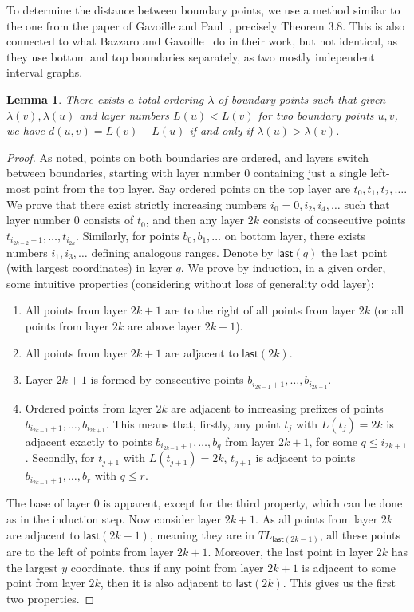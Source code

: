 \documentclass[a4paper,11pt]{article}
\newcommand{\lam}{\lambda}
\newcommand{\last}{\mathsf{last}}
\newtheorem{lemma}[theorem]{Lemma}
\begin{document}
To determine the distance between boundary points, we use a method similar to the one from the paper of
Gavoille and Paul~\cite{GavInterval}, precisely Theorem 3.8.
This is also connected to what Bazzaro and Gavoille~\cite{BazzaroG05} do in their work, but not identical,
as they use bottom and top boundaries separately, as two mostly independent interval graphs.

\begin{lemma}
There exists a total ordering $\lam$ of boundary points such that given $\lam(v), \lam(u)$
and layer numbers $L(u) < L(v)$ for two boundary points $u,v$, we have $d(u,v)=L(v)-L(u)$
if and only if $\lam(u) > \lam(v)$.
\label{Lem:Lambda}
\end{lemma}
\begin{proof}
As noted, points on both boundaries are ordered, and layers switch between boundaries,
starting with layer number 0 containing just a single left-most point from the top layer.
Say ordered points on the top layer are $t_0,t_1,t_2,\ldots$.
We prove that there exist strictly increasing numbers $i_0=0,i_2,i_4,\ldots$ such that layer number 0 consists of $t_0$,
and then any layer $2k$ consists of consecutive points $t_{i_{2k-2}+1},\ldots,t_{i_{2k}}$.
Similarly, for points $b_0,b_1,\ldots$ on bottom layer, there exists numbers $i_1,i_3,\ldots$ defining analogous ranges.
Denote by $\last(q)$ the last point (with largest coordinates) in layer $q$.
We prove by induction, in a given order, some intuitive properties (considering without loss of generality odd layer):
\begin{enumerate}
\item All points from layer $2k+1$ are to the right of all points from layer $2k$ (or all points from layer $2k$ are above layer $2k-1$).
\item All points from layer $2k+1$ are adjacent to $\last(2k)$.
\item Layer $2k+1$ is formed by consecutive points $b_{i_{2k-1}+1},\ldots,b_{i_{2k+1}}$.
\item Ordered points from layer $2k$ are adjacent to increasing prefixes of points $b_{i_{2k-1}+1},\ldots,b_{i_{2k+1}}$.
This means that, firstly, any point $t_j$ with $L(t_j)=2k$ is adjacent exactly to points $b_{i_{2k-1}+1}, \ldots, b_q$
from layer $2k+1$, for some $q \leq i_{2k+1}$.
Secondly, for $t_{j+1}$ with $L(t_{j+1})=2k$, $t_{j+1}$ is adjacent to points $b_{i_{2k-1}+1}, \ldots, b_r$ with $q \leq r$.
\end{enumerate}
The base of layer 0 is apparent, except for the third property, which can be done as in the induction step.
Now consider layer $2k+1$.
As all points from layer $2k$ are adjacent to $\last(2k-1)$, meaning they are in $TL_{\last(2k-1)}$,
all these points are to the left of points from layer $2k+1$.
Moreover, the last point in layer $2k$ has the largest $y$ coordinate, thus if any point from layer $2k+1$
is adjacent to some point from layer $2k$, then it is also adjacent to $\last(2k)$.
This gives us the first two properties.


\end{proof}
\end{document}
